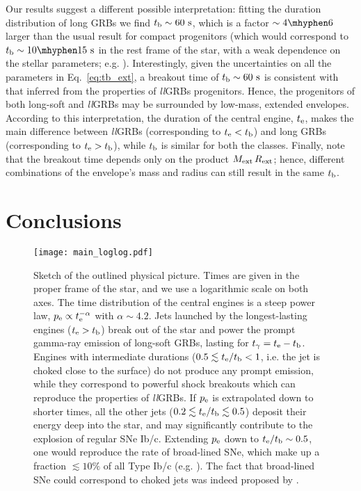\documentclass[useAMS,usenatbib]{mn2e}
\begin{document}
Our results suggest a different possible interpretation: fitting the duration distribution of long GRBs we find $t_{\rm b}\sim 60\text{ s}$, which is a factor $\sim 4\mhyphen 6$ larger than the usual result for compact progenitors (which would correspond to $t_{\rm b}\sim 10\mhyphen15\text{ s}$ in the rest frame of the star, with a weak dependence on the stellar parameters; e.g. \citealt{Bromberg2011}). Interestingly, given the uncertainties on all the parameters in Eq.~\eqref{eq:tb_ext}, a breakout time of $t_{\rm b}\sim 60\text{ s}$ is consistent with that inferred from the properties of {\it ll}GRBs progenitors. Hence, the progenitors of both long-soft and {\it ll}GRBs may be surrounded by low-mass, extended envelopes. According to this interpretation, the duration of the central engine, $t_{\rm e}$, makes the main difference between {\it ll}GRBs (corresponding to $t_{\rm e}<t_{\rm b}$) and long GRBs (corresponding to $t_{\rm e}>t_{\rm b}$), while $t_{\rm b}$ is similar for both the classes. Finally, note that the breakout time depends only on the product $M_{\rm ext}\,R_{\rm ext}$; hence, different combinations of the envelope's mass and radius can still result in the same $t_{\rm b}$.


\section{Conclusions}
\label{sec:concl}

\begin{figure*}{\vspace{3mm}} 
\centering
\texttt{[image: main\_loglog.pdf]}
\caption{Sketch of the outlined physical picture. Times are given in the proper frame of the star, and we use a logarithmic scale on both axes. The time distribution of the central engines is a steep power law, $p_{\rm e}\propto t_{\rm e}^{-\alpha}$ with $\alpha\sim 4.2$. Jets launched by the longest-lasting engines ($t_{\rm e}>t_{\rm b}$) break out of the star and power the prompt gamma-ray emission of long-soft GRBs, lasting for $t_\gamma=t_{\rm e}-t_{\rm b}$. Engines with intermediate durations ($0.5\lesssim t_{\rm e}/t_{\rm b}<1$, i.e. the jet is choked close to the surface) do not produce any prompt emission, while they correspond to powerful shock breakouts which can reproduce the properties of {\it ll}GRBs. If $p_{\rm e}$ is extrapolated down to shorter times, all the other jets ($0.2\lesssim t_{\rm e}/t_{\rm b}\lesssim 0.5$) deposit their energy deep into the star, and may significantly contribute to the explosion of regular SNe Ib/c. Extending $p_{\rm e}$ down to $t_{\rm e}/t_{\rm b}\sim 0.5$, one would reproduce the rate of broad-lined SNe, which make up a fraction $\lesssim 10\%$ of all Type Ib/c (e.g. \citealt{GuettaDellavalle2007, Drout2011}). The fact that broad-lined SNe could correspond to choked jets was indeed proposed by \citet{Modjaz2016}.}
\label{fig:main}
\end{figure*}
\end{document}
